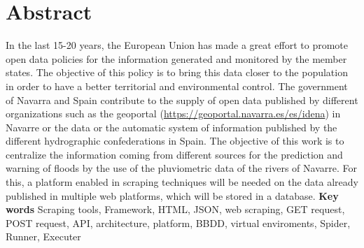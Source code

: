 \chapter*{Abstract}
In the last 15-20 years, the European Union has made a great effort to promote open data policies for the information generated and monitored by the member states. The objective of this policy is to bring this data closer to the population in order to have a better territorial and environmental control. The government of Navarra and Spain contribute to the supply of open data published by different organizations such as the geoportal (\url{https://geoportal.navarra.es/es/idena}) in Navarre or the data or the automatic system of information published by the different hydrographic confederations in Spain.\newline
\newline
The objective of this work is to centralize the information coming from different sources for the prediction and warning of floods by the use of the pluviometric data of the rivers of Navarre. For this, a platform enabled in scraping techniques will be needed on the data already published in multiple web platforms, which will be stored in a database.
\newline
\newline
\newline
\newline
\textbf{{\LARGE Key words}}
\newline
\newline
Scraping tools, Framework, HTML, JSON, web scraping, GET request, POST request, API, architecture, platform, BBDD, virtual enviroments, Spider, Runner, Executer